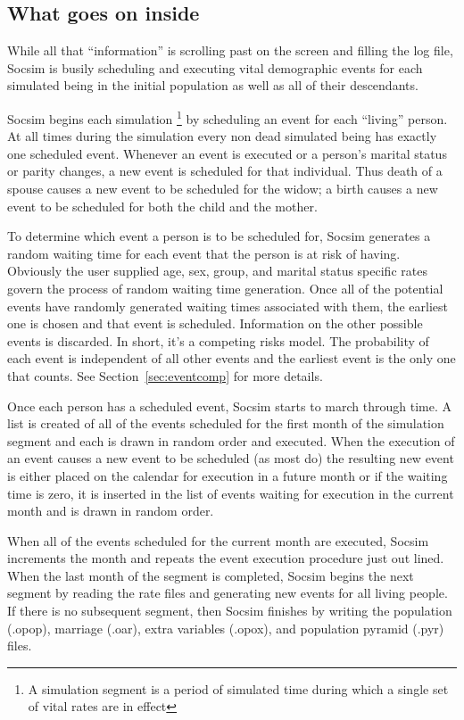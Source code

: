 \subsection{What goes on inside}
\label{sec:inside}

While all that ``information'' is scrolling past on the screen and
filling the log file, Socsim is busily scheduling and executing vital
demographic events for each simulated being in the initial population
as well as all of their descendants.

Socsim begins each simulation \footnote{A simulation
  segment is a period of simulated time during which a single set of
  vital rates are in effect} by scheduling an event for each
``living'' person.   At all times during the simulation every non dead
simulated being has exactly one scheduled event.  Whenever an event is
executed or a person's marital status or parity changes, a new event
is scheduled for that individual.  Thus death of a spouse causes a new
event to be scheduled for the widow; a birth causes a new event to be
scheduled for both the child and the mother.

To determine which event a person is to be scheduled for, Socsim
generates a random waiting time for each event that the person is at
risk of having.  Obviously the user supplied age, sex, group, and
marital status specific rates govern the process of random waiting
time generation.  Once all of the potential events have randomly
generated waiting times associated with them, the earliest one is
chosen and that event is scheduled.  Information on the other possible
events is discarded.  In short, it's a competing risks model.  The
probability of each event is independent of all other events and the
earliest event is the only one that counts. See
Section~\ref{sec:eventcomp} for more details.

Once each person has a scheduled event, Socsim starts to march through
time. A list is created of all of the events scheduled for the first
month of the simulation segment and each is drawn in random order and
executed.  When the execution of an event causes a new event to be
scheduled (as most do) the resulting new event is either placed on the
calendar for execution in a future month or if the waiting time is
zero, it is  inserted in the list of events waiting for
execution in the current month and is drawn in random order.

When all of the events scheduled for the current month are executed,
Socsim increments the month and repeats the event execution procedure
just out lined.  When the last month of the segment is completed,
Socsim begins the next segment by reading the rate files and
generating new events for all living people.  If there is no
subsequent segment, then Socsim finishes by writing the population
(.opop), marriage (.oar), extra variables (.opox), and population
pyramid (.pyr) files.

